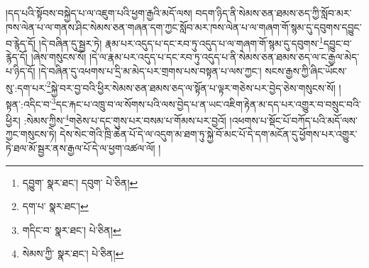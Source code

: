 །དད་པའི་སྟོབས་བསྐྱེད་པ་ལ་འཇུག་པའི་ཕྱག་རྒྱའི་མདོ་ལས། བདག་ཉིད་ནི་སེམས་ཅན་ཐམས་ཅད་ཀྱི་སློབ་མར་ཁས་ལེན་པ་ལ་གནས་ཤིང་སེམས་ཅན་གཞན་དག་ཀྱང་སློབ་མར་ཁས་ལེན་པ་ལ་གཞག་གོ་སྙམ་དུ་དབུགས་དབྱུང་བ་རྙེད་དོ། །དེ་བཞིན་དུ་སྦྱར་ཏེ། རྣམ་པར་འདུད་པ་དང་རབ་ཏུ་འདུད་པ་ལ་གཞག་གོ་སྙམ་དུ་དབུགས་\footnote{དབྱུག་  སྣར་ཐང་། དབུག་  པེ་ཅིན། }དབྱུང་བ་རྙེད་དོ། །ཞེས་གསུངས་སོ། །དེ་ལ་རྣམ་པར་འདུད་པ་དང་རབ་ཏུ་འདུད་པ་ནི་སེམས་ཅན་ཐམས་ཅད་ལ་ང་རྒྱལ་མེད་པ་ཉིད་དོ། །དེ་བཞིན་དུ་འཕགས་པ་དྲི་མ་མེད་པར་གྲགས་པས་བསྟན་པ་ལས་ཀྱང་། སངས་རྒྱས་ཀྱི་ཞིང་ཡོངས་སུ་:དག་པར་\footnote{དག་པ་  སྣར་ཐང་། }སྐྱེ་བར་བྱ་བའི་ཕྱིར་སེམས་ཅན་ཐམས་ཅད་ལ་སྟོན་པ་ལྟར་གཅེས་པར་བྱེད་ཅེས་གསུངས་སོ། །སྟན་:འདིང་བ་\footnote{གདིང་བ་  སྣར་ཐང་།  པེ་ཅིན། }དང་རྐང་པ་འཁྲུ་བ་ལ་སོགས་པའི་ལས་བྱེད་པ་ན་ཡང་འཇིག་རྟེན་མ་དད་པར་འགྱུར་བ་བསྲུང་བའི་ཕྱིར། :སེམས་ཀྱིས་\footnote{སེམས་ཀྱི་  སྣར་ཐང་།  པེ་ཅིན། }གཅེས་པ་དང་གུས་པར་བསམ་པ་གོམས་པར་བྱའོ། །འཕགས་པ་སྡོང་པོ་བཀོད་པའི་མདོ་ལས་ཀྱང་གསུངས་ཏེ། དེས་སེང་གེའི་ཁྲི་ཆེན་པོ་དེ་ལ་འདུག་མ་ཐག་ཏུ་སྐྱེ་བོ་མང་པོ་དེ་དག་མངོན་དུ་ཕྱོགས་པར་འགྱུར་ཏེ་ཐལ་མོ་སྦྱར་ནས་རྒྱལ་པོ་དེ་ལ་ཕྱག་འཚལ་ལོ། །
